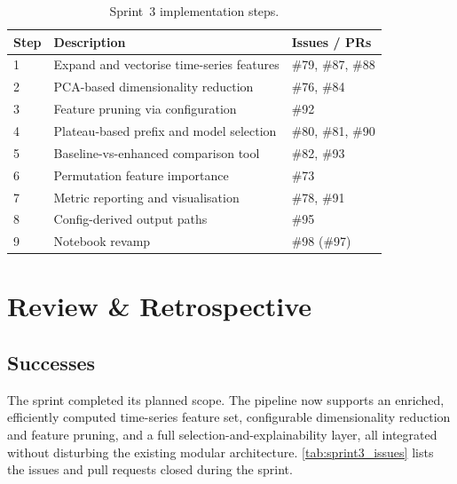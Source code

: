\documentclass[runningheads]{llncs}
\begin{document}
\begin{table}[H]
    \centering
    \caption{Sprint~3 implementation steps.}
    \label{tab:steps}
    \begin{tabularx}{\textwidth}{lXX}
        \toprule
        \textbf{Step} & \textbf{Description}                      & \textbf{Issues / PRs} \\
        \midrule
        1             & Expand and vectorise time-series features & \#79, \#87, \#88      \\
        2             & PCA-based dimensionality reduction        & \#76, \#84            \\
        3             & Feature pruning via configuration         & \#92                  \\
        4             & Plateau-based prefix and model selection  & \#80, \#81, \#90      \\
        5             & Baseline-vs-enhanced comparison tool      & \#82, \#93            \\
        6             & Permutation feature importance            & \#73                  \\
        7             & Metric reporting and visualisation        & \#78, \#91            \\
        8             & Config-derived output paths               & \#95                  \\
        9             & Notebook revamp                           & \#98 (\#97)           \\
        \bottomrule
    \end{tabularx}
\end{table}

\section{Review \& Retrospective}

\subsection{Successes}
The sprint completed its planned scope. The pipeline now supports an enriched, efficiently
computed time-series feature set, configurable dimensionality reduction and feature pruning, and
a full selection-and-explainability layer, all integrated without disturbing the existing modular
architecture. \autoref{tab:sprint3_issues} lists the issues and pull requests closed during the
sprint.
\end{document}
